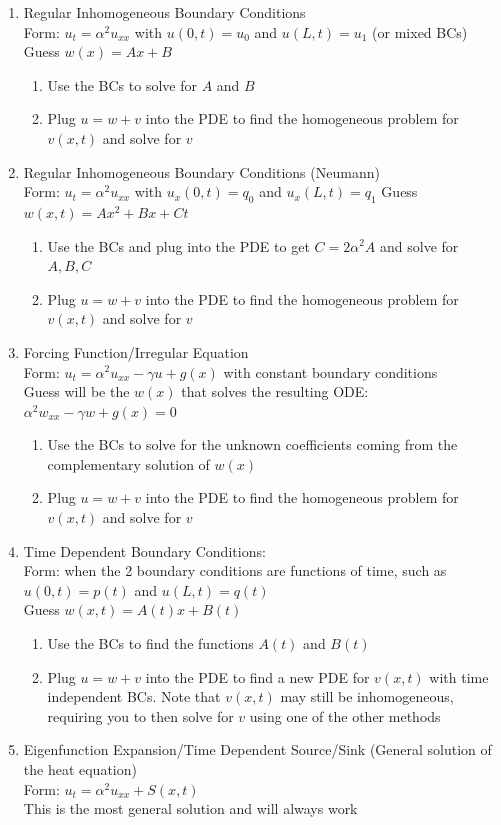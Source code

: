 \documentclass[11pt, fleqn]{article}
\begin{document}
\begin{enumerate}
    \item Regular Inhomogeneous Boundary Conditions\\
    Form: $u_t=\alpha^2u_{xx}$ with $u(0,t)=u_0$ and $u(L,t)=u_1$ (or mixed BCs)\\
    Guess $w(x)=Ax+B$
    \begin{enumerate}
        \item Use the BCs to solve for $A$ and $B$
        \item Plug $u=w+v$ into the PDE to find the homogeneous problem for $v(x,t)$ and solve for $v$
    \end{enumerate}
    \item Regular Inhomogeneous Boundary Conditions (Neumann)\\
    Form: $u_t=\alpha^2u_{xx}$ with $u_x(0,t)=q_0$ and $u_x(L,t)=q_1$
    Guess $w(x,t)=Ax^2+Bx+Ct$
    \begin{enumerate}
        \item Use the BCs and plug into the PDE to get $C=2\alpha^2A$ and solve for $A,B,C$
        \item Plug $u=w+v$ into the PDE to find the homogeneous problem for $v(x,t)$ and solve for $v$
    \end{enumerate}
    \item Forcing Function/Irregular Equation\\
    Form: $u_t=\alpha^2u_{xx}-\gamma u+g(x)$ with constant boundary conditions\\
    Guess will be the $w(x)$ that solves the resulting ODE: $\alpha^2w_{xx}-\gamma w+g(x)=0$
    \begin{enumerate}
        \item Use the BCs to solve for the unknown coefficients coming from the complementary solution of $w(x)$
        \item Plug $u=w+v$ into the PDE to find the homogeneous problem for $v(x,t)$ and solve for $v$
    \end{enumerate}
    \item Time Dependent Boundary Conditions:\\
    Form: when the 2 boundary conditions are functions of time, such as $u(0,t)=p(t)$ and $u(L,t)=q(t)$\\
    Guess $w(x,t)=A(t)x+B(t)$
    \begin{enumerate}
        \item Use the BCs to find the functions $A(t)$ and $B(t)$
        \item Plug $u=w+v$ into the PDE to find a new PDE for $v(x,t)$ with time independent BCs. Note that $v(x,t)$ may still be inhomogeneous, requiring you to then solve for $v$ using one of the other methods
    \end{enumerate}
    \item Eigenfunction Expansion/Time Dependent Source/Sink (General solution of the heat equation)\\
    Form: $u_t=\alpha^2u_{xx}+S(x,t)$\\
    This is the most general solution and will always work


\end{enumerate}
\end{document}
